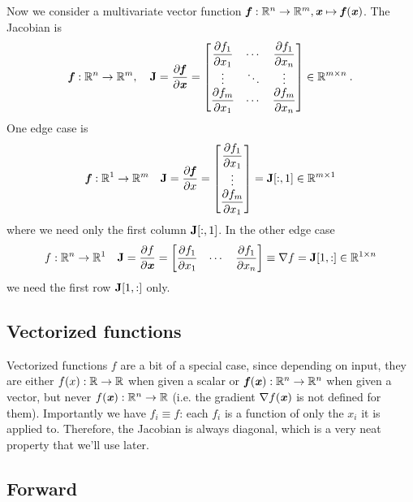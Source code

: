 \documentclass[paper=a4,11pt,headsepline]{scrartcl}
\begin{document}
Now we consider a multivariate vector function $\bm{\mathit{f}}: \mathbb R^n \rightarrow \mathbb
R^m, \bm{\mathit{x}}\mapsto \bm{\mathit{f}}(\bm{\mathit{x}})$. The Jacobian is
\begin{equation*}
    \bm{\mathit{f}}: \mathbb R^n \rightarrow \mathbb R^m,\quad \bm{\mathbf{J}}
    = \dfrac{\partial \bm{\mathit{f}}}{\partial \bm{\mathit{x}}} =
    \begin{bmatrix}
        \dfrac{\partial f_1}{\partial x_1} & \cdots & \dfrac{\partial f_1}{\partial x_n}  \\
        \vdots        & \ddots & \vdots         \\
        \dfrac{\partial f_m}{\partial x_1} & \cdots & \dfrac{\partial f_m}{\partial x_n}
    \end{bmatrix}
    \in\mathbb R^{m\times n}
    \:.
\end{equation*}
One edge case is
\begin{equation*}
    \bm{\mathit{f}}: \mathbb R^1 \rightarrow \mathbb R^m\quad \bm{\mathbf{J}}
    = \dfrac{\partial \bm{\mathit{f}}}{\partial x} =
    \begin{bmatrix}
        \dfrac{\partial f_1}{\partial x_1}  \\
        \vdots         \\
        \dfrac{\partial f_m}{\partial x_1}
    \end{bmatrix}
    = \bm{\mathbf{J}}[:,1]\in\mathbb R^{m\times 1}
\end{equation*}
where we need only the first column $\bm{\mathbf{J}}[:,1]$. In the other edge case
\begin{equation*}
    f: \mathbb R^n \rightarrow \mathbb R^1\quad \bm{\mathbf{J}}
    = \dfrac{\partial f}{\partial \bm{\mathit{x}}} =
    \begin{bmatrix}
        \dfrac{\partial f_1}{\partial x_1} & \cdots & \dfrac{\partial f_1}{\partial x_n}
    \end{bmatrix} \equiv \nabla f
    = \bm{\mathbf{J}}[1,:] \in\mathbb R^{1\times n}
\end{equation*}
we need the first row $\bm{\mathbf{J}}[1,:]$ only.

\subsection{Vectorized \numpy functions}

Vectorized \numpy functions $f$ are a bit of a special case, since depending on
input, they are either $f(x):\mathbb R\rightarrow\mathbb R$ when given a scalar or $\bm{\mathit{f}}(\bm{\mathit{x}}):\mathbb R^n\rightarrow\mathbb R^n$ when given a vector, but never $f(\bm{\mathit{x}}):
\mathbb R^n \rightarrow \mathbb R$ (i.e. the gradient $\nabla f(\bm{\mathit{x}})$ is not defined
for them). Importantly we have $f_i\equiv f$: each $f_i$ is a function of only the $x_i$
it is applied to. Therefore, the Jacobian is always diagonal, which is a very neat
property that we'll use later.

\subsection{Forward}
\end{document}
